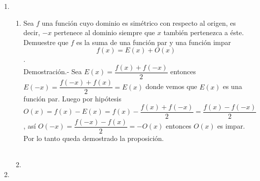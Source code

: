 \begin{enumerate}
\item
\begin{enumerate}[\bfseries a)]

    \item Sea $f$ una función cuyo dominio es simétrico con respecto al origen, es decir, $-x$ pertenece al dominio siempre que $x$ también pertenezca a éste. Demuestre que $f$ es la suma de una función par y una función impar $$f(x) = E(x) + O(x)$$.\\
	Demostración.-\; Sea $E(x) = \dfrac{f(x) + f(-x)}{2}$ entonces $E(-x) = \dfrac{f(-x) + f(x)}{2} = E(x)$ donde vemos que $E(x)$ es una función par. Luego por hipótesis $O(x) = f(x) - E(x) = f(x) - \dfrac{f(x)+f(-x)}{2} = \dfrac{f(x)-f(-x)}{2}$, así $O(-x) = \dfrac{f(-x)-f(x)}{2} = -O(x)$ entonces $O(x)$ es impar. Por lo tanto queda demostrado la proposición.\\\\

    \item 

\end{enumerate}

\item 


\end{enumerate}
